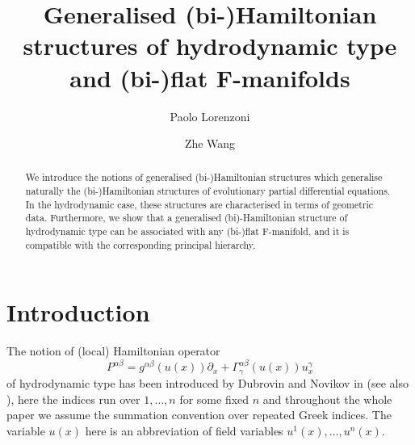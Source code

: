 \documentclass[11pt,a4paper]{amsart}
\numberwithin{equation}{section}
\newcommand{\qa}{\alpha}
\newcommand{\qb}{\beta}
\newcommand{\qg}{\gamma}
\numberwithin{equation}{section}
\begin{document}
\title[Generalised Hamiltonian Structures]{Generalised (bi-)Hamiltonian structures of hydrodynamic type and (bi-)flat F-manifolds}

\author{Paolo Lorenzoni}
\address{P.~Lorenzoni:\newline Dipartimento di Matematica e Applicazioni, Universit\`a degli Studi di Milano-Bicocca, 
Via Roberto Cozzi 53, I-20125 Milano, Italy and INFN sezione di Milano-Bicocca}

\author{Zhe Wang}
\address{Z.~Wang:\newline RIKEN Center for Interdisciplinary Theoretical and Mathematical Sciences (iTHEMS), RIKEN, Wako 351-0198, Japan}


\date{}

\maketitle

\begin{abstract}
 We introduce the notions of generalised (bi-)Hamiltonian structures which generalise naturally the (bi-)Hamiltonian structures of evolutionary partial differential equations. In the hydrodynamic case, these structures are characterised in terms of geometric data. 
 Furthermore, we show that a generalised (bi)-Hamiltonian structure of hydrodynamic type can be associated with any (bi-)flat F-manifold, and it is compatible with the corresponding principal hierarchy.
\end{abstract}
\tableofcontents

\section{Introduction}
The notion of (local) Hamiltonian operator
\begin{equation}\label{PBHT}
P^{\qa\qb}=g^{\qa\qb}(u(x))\partial_x+\Gamma^{\qa\qb}_{\qg}(u(x))u^\qg_x
\end{equation}
of hydrodynamic type has been introduced by Dubrovin and Novikov in \cite{DN84} (see also \cite{DN89}), here the indices run over $1,\dots, n$ for some fixed $n$ and throughout the whole paper we assume the summation convention over repeated Greek indices. The variable $u(x)$ here is an abbreviation of field variables $u^1(x),\dots,u^n(x)$.
\end{document}
